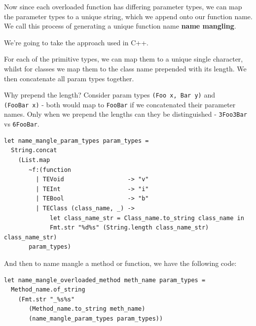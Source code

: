 Now since each overloaded function has differing parameter types, we can
map the parameter types to a unique string, which we append onto our
function name. We call this process of generating a unique function name
\textbf{name mangling}.

We're going to take the approach used in C++.

For each of the primitive types, we can map them to a unique single
character, whilst for classes we map them to the class name prepended
with its length. We then concatenate all param types together.

Why prepend the length? Consider param types \texttt{(Foo\ x,\ Bar\ y)}
and \texttt{(FooBar\ x)} - both would map to \texttt{FooBar} if we
concatenated their parameter names. Only when we prepend the lengths can
they be distinguished - \texttt{3Foo3Bar} vs \texttt{6FooBar}.
%
%

\begin{lstlisting}[caption={desugar\_overloading.ml},language=caml]
let name_mangle_param_types param_types =
  String.concat
    (List.map
       ~f:(function
         | TEVoid                  -> "v"
         | TEInt                   -> "i"
         | TEBool                  -> "b"
         | TEClass (class_name, _) ->
             let class_name_str = Class_name.to_string class_name in
             Fmt.str "%d%s" (String.length class_name_str) class_name_str)
       param_types)
\end{lstlisting}


And then to name mangle a method or function, we have the following
code:

\begin{lstlisting}[caption={desugar\_overloading.ml},language=caml]
let name_mangle_overloaded_method meth_name param_types =
  Method_name.of_string
    (Fmt.str "_%s%s"
       (Method_name.to_string meth_name)
       (name_mangle_param_types param_types))
\end{lstlisting}

